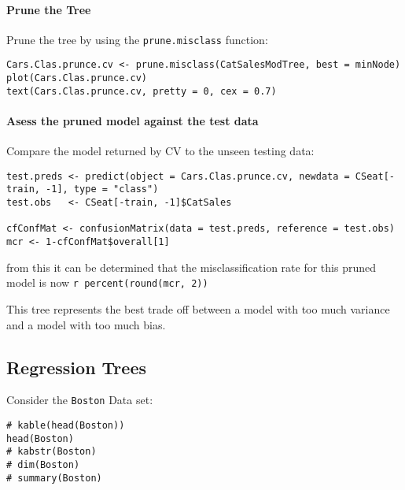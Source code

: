 \documentclass[
]{article}
\newcommand{\passthrough}[1]{#1}
\begin{document}
\hypertarget{prune-the-tree}{%
\paragraph{Prune the Tree}\label{prune-the-tree}}

Prune the tree by using the \passthrough{\lstinline!prune.misclass!}
function:

\begin{lstlisting}
Cars.Clas.prunce.cv <- prune.misclass(CatSalesModTree, best = minNode)
plot(Cars.Clas.prunce.cv)
text(Cars.Clas.prunce.cv, pretty = 0, cex = 0.7)
\end{lstlisting}

\hypertarget{asess-the-pruned-model-against-the-test-data}{%
\paragraph{Asess the pruned model against the test
data}\label{asess-the-pruned-model-against-the-test-data}}

Compare the model returned by CV to the unseen testing data:

\begin{lstlisting}
test.preds <- predict(object = Cars.Clas.prunce.cv, newdata = CSeat[-train, -1], type = "class")
test.obs   <- CSeat[-train, -1]$CatSales

cfConfMat <- confusionMatrix(data = test.preds, reference = test.obs)
mcr <- 1-cfConfMat$overall[1]
\end{lstlisting}

from this it can be determined that the misclassification rate for this
pruned model is now \passthrough{\lstinline!r percent(round(mcr, 2))!}

This tree represents the best trade off between a model with too much
variance and a model with too much bias.

\hypertarget{regression-trees}{%
\subsection{Regression Trees}\label{regression-trees}}

Consider the \passthrough{\lstinline!Boston!} Data set:

\begin{lstlisting}
# kable(head(Boston))
head(Boston)
# kabstr(Boston)
# dim(Boston)
# summary(Boston)



\end{lstlisting}
\end{document}
